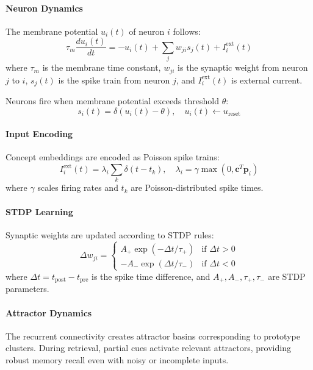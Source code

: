 \documentclass{article}
\begin{document}
\paragraph{Neuron Dynamics} The membrane potential $u_i(t)$ of neuron $i$ follows:
\begin{equation}
\tau_m \frac{du_i(t)}{dt} = -u_i(t) + \sum_j w_{ji} s_j(t) + I_i^{\text{ext}}(t)
\end{equation}
where $\tau_m$ is the membrane time constant, $w_{ji}$ is the synaptic weight from neuron $j$ to $i$, $s_j(t)$ is the spike train from neuron $j$, and $I_i^{\text{ext}}(t)$ is external current.

Neurons fire when membrane potential exceeds threshold $\theta$:
\begin{equation}
s_i(t) = \delta(u_i(t) - \theta), \quad u_i(t) \leftarrow u_{\text{reset}}
\end{equation}

\paragraph{Input Encoding} Concept embeddings are encoded as Poisson spike trains:
\begin{equation}
I_i^{\text{ext}}(t) = \lambda_i \sum_k \delta(t - t_k), \quad \lambda_i = \gamma \max(0, \mathbf{c}^T \mathbf{p}_i)
\end{equation}
where $\gamma$ scales firing rates and $t_k$ are Poisson-distributed spike times.

\paragraph{STDP Learning} Synaptic weights are updated according to STDP rules:
\begin{equation}
\Delta w_{ji} = \begin{cases}
A_+ \exp(-\Delta t / \tau_+) & \text{if } \Delta t > 0 \\
-A_- \exp(\Delta t / \tau_-) & \text{if } \Delta t < 0
\end{cases}
\end{equation}
where $\Delta t = t_{\text{post}} - t_{\text{pre}}$ is the spike time difference, and $A_+, A_-, \tau_+, \tau_-$ are STDP parameters.

\paragraph{Attractor Dynamics} The recurrent connectivity creates attractor basins corresponding to prototype clusters. During retrieval, partial cues activate relevant attractors, providing robust memory recall even with noisy or incomplete inputs.
\end{document}
